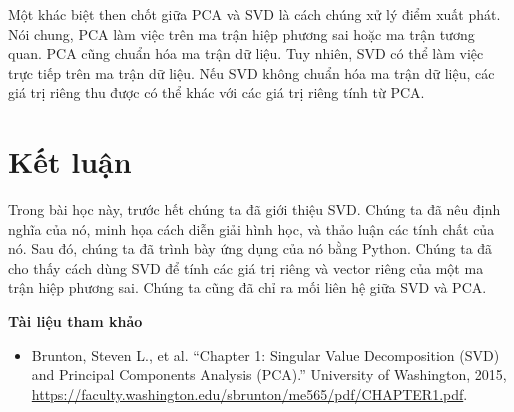 Một khác biệt then chốt giữa PCA và SVD là cách chúng xử lý điểm xuất phát. Nói chung, PCA làm việc trên ma trận hiệp phương sai hoặc ma trận tương quan. PCA cũng chuẩn hóa ma trận dữ liệu. Tuy nhiên, SVD có thể làm việc trực tiếp trên ma trận dữ liệu. Nếu SVD không chuẩn hóa ma trận dữ liệu, các giá trị riêng thu được có thể khác với các giá trị riêng tính từ PCA.

\section{Kết luận}

Trong bài học này, trước hết chúng ta đã giới thiệu SVD. Chúng ta đã nêu định nghĩa của nó, minh họa cách diễn giải hình học, và thảo luận các tính chất của nó. Sau đó, chúng ta đã trình bày ứng dụng của nó bằng Python. Chúng ta đã cho thấy cách dùng SVD để tính các giá trị riêng và vector riêng của một ma trận hiệp phương sai. Chúng ta cũng đã chỉ ra mối liên hệ giữa SVD và PCA.

\textbf{Tài liệu tham khảo}

\begin{itemize}
  \item Brunton, Steven L., et al. ``Chapter 1: Singular Value Decomposition (SVD) and Principal Components Analysis (PCA).'' University of Washington, 2015, \url{https://faculty.washington.edu/sbrunton/me565/pdf/CHAPTER1.pdf}.
\end{itemize}

